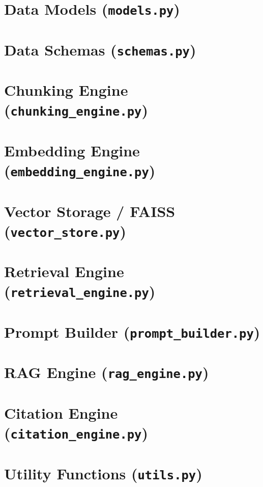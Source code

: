 \documentclass[12pt, a4paper]{report}
\begin{document}
\section{Data Models (\texttt{models.py})}


\section{Data Schemas (\texttt{schemas.py})}


\section{Chunking Engine (\texttt{chunking\_engine.py})}


\section{Embedding Engine (\texttt{embedding\_engine.py})}


\section{Vector Storage / FAISS (\texttt{vector\_store.py})}


\section{Retrieval Engine (\texttt{retrieval\_engine.py})}


\section{Prompt Builder (\texttt{prompt\_builder.py})}


\section{RAG Engine (\texttt{rag\_engine.py})}


\section{Citation Engine (\texttt{citation\_engine.py})}


\section{Utility Functions (\texttt{utils.py})}

\end{document}

